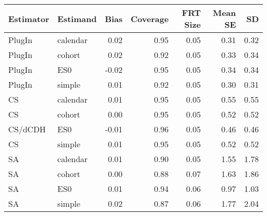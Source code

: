 \captionsetup[table]{labelformat=empty,skip=1pt}
\begin{longtable}{llrrrrr}
\toprule
Estimator & Estimand & Bias & Coverage & FRT Size & Mean SE & SD \\ 
\midrule
PlugIn & calendar & 0.02 & 0.95 & 0.05 & 0.31 & 0.32 \\ 
PlugIn & cohort & 0.02 & 0.92 & 0.05 & 0.33 & 0.34 \\ 
PlugIn & ES0 & -0.02 & 0.95 & 0.05 & 0.34 & 0.34 \\ 
PlugIn & simple & 0.01 & 0.92 & 0.05 & 0.30 & 0.31 \\ 
CS & calendar & 0.01 & 0.95 & 0.05 & 0.55 & 0.55 \\ 
CS & cohort & 0.00 & 0.95 & 0.05 & 0.52 & 0.52 \\ 
CS/dCDH & ES0 & -0.01 & 0.96 & 0.05 & 0.46 & 0.46 \\ 
CS & simple & 0.01 & 0.95 & 0.05 & 0.52 & 0.52 \\ 
SA & calendar & 0.01 & 0.90 & 0.05 & 1.55 & 1.78 \\ 
SA & cohort & 0.00 & 0.88 & 0.07 & 1.63 & 1.86 \\ 
SA & ES0 & 0.01 & 0.94 & 0.06 & 0.97 & 1.03 \\ 
SA & simple & 0.02 & 0.87 & 0.06 & 1.77 & 2.04 \\ 
 \bottomrule
\end{longtable}

